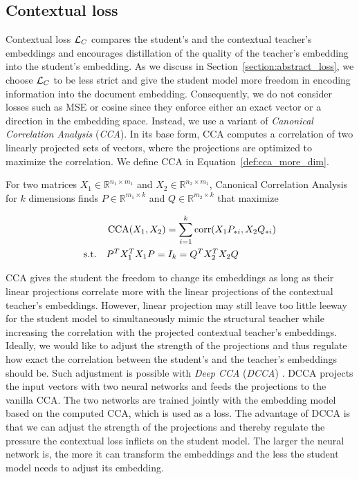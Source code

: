 \subsection{Contextual loss}\label{section:contextual_loss}

Contextual loss $\mathcal{L}_C$ compares the student's and the contextual teacher's
embeddings and encourages distillation of the quality of the teacher's
embedding into the student's embedding. As we discuss in
Section~\ref{section:abstract_loss}, we choose $\mathcal{L}_C$ to be less strict and
give the student model more freedom in encoding information into the
document embedding. Consequently, we do not consider losses such as MSE or
cosine since they enforce either an exact vector or a direction in the
embedding space. Instead, we use a variant of \emph{Canonical Correlation
Analysis} \citep{hotelling1992relations} (\emph{CCA}). In its base form, CCA
computes a correlation of two linearly projected sets of vectors, where the
projections are optimized to maximize the correlation. We define CCA
in Equation~\ref{def:cca_more_dim}.

\begin{defn}\label{def:cca_more_dim}

  For two matrices $X_1 \in \mathbb{R}^{n_1 \times m_1}$ and $X_2 \in
  \mathbb{R}^{n_2 \times m_1}$, Canonical Correlation Analysis for $k$
  dimensions finds $P \in \mathbb{R}^{m_1 \times k}$ and $Q \in \mathbb{R}^{m_2
  \times k}$ that maximize

  \begin{equation}
    \begin{split}
      &\operatorname*{CCA}(X_1, X_2) = \sum_{i = 1}^k \operatorname*{corr}(X_1P_{*i}, X_2Q_{*i}) \\
      \text{s.t.}\quad &P^TX_1^TX_1P = I_k = Q^TX_2^TX_2Q \\
    \end{split}
  \end{equation}


\end{defn}

CCA gives the student the freedom to change its embeddings as long as their
linear projections correlate more with the linear projections of the contextual
teacher's embeddings. However, linear projection may still leave too little
leeway for the student model to simultaneously mimic the structural teacher
while increasing the correlation with the projected contextual teacher's
embeddings. Ideally, we would like to adjust the strength of the projections and
thus regulate how exact the correlation between the student's and the
teacher's embeddings should be. Such adjustment is possible with \emph{Deep CCA}
(\emph{DCCA}) \citep{andrew2013deep}. DCCA projects the input vectors with two
neural networks and feeds the projections to the vanilla CCA. The two
networks are trained jointly with the embedding model based on
the computed CCA, which is used as a loss. The advantage of DCCA is that we can
adjust the strength of the projections and thereby regulate the pressure the
contextual loss inflicts on the student model. The larger the neural network
is, the more it can transform the embeddings and the less the student model needs to adjust its embedding.

